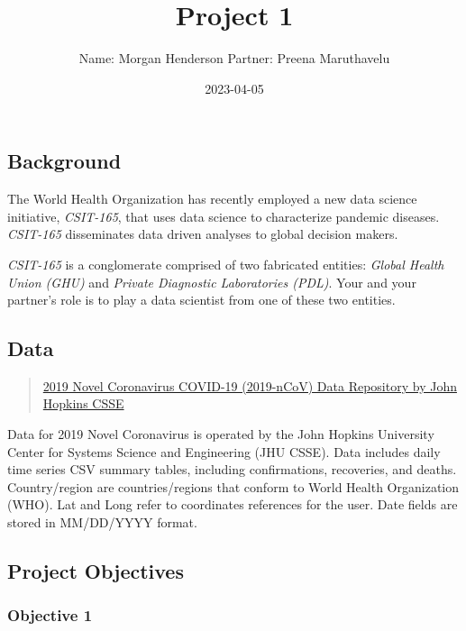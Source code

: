 \documentclass[
]{article}
\title{Project 1}
\author{Name: Morgan Henderson Partner: Preena Maruthavelu}
\date{2023-04-05}
\begin{document}
\maketitle

{
\setcounter{tocdepth}{3}
\tableofcontents
}
\hypertarget{background}{%
\subsection{Background}\label{background}}

The World Health Organization has recently employed a new data science
initiative, \emph{CSIT-165}, that uses data science to characterize
pandemic diseases. \emph{CSIT-165} disseminates data driven analyses to
global decision makers.

\emph{CSIT-165} is a conglomerate comprised of two fabricated entities:
\emph{Global Health Union (GHU)} and \emph{Private Diagnostic
Laboratories (PDL)}. Your and your partner's role is to play a data
scientist from one of these two entities.

\hypertarget{data}{%
\subsection{Data}\label{data}}

\begin{quote}
\href{https://github.com/CSSEGISandData/COVID-19/tree/master/csse_covid_19_data/csse_covid_19_time_series}{2019
Novel Coronavirus COVID-19 (2019-nCoV) Data Repository by John Hopkins
CSSE}
\end{quote}

Data for 2019 Novel Coronavirus is operated by the John Hopkins
University Center for Systems Science and Engineering (JHU CSSE). Data
includes daily time series CSV summary tables, including confirmations,
recoveries, and deaths. Country/region are countries/regions that
conform to World Health Organization (WHO). Lat and Long refer to
coordinates references for the user. Date fields are stored in
MM/DD/YYYY format.

\hypertarget{project-objectives}{%
\subsection{Project Objectives}\label{project-objectives}}

\hypertarget{objective-1}{%
\subsubsection{Objective 1}\label{objective-1}}
\end{document}
